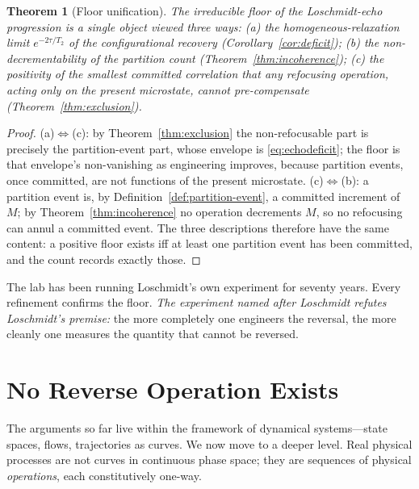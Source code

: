 \documentclass[11pt,a4paper]{article}
\theoremstyle{thmstyle}
\newtheorem{theorem}{Theorem}[section]
\theoremstyle{definition}
\theoremstyle{remark}
\newcommand{\Ttwo}{T_{2}}
\newcommand{\Count}{M}
\begin{document}
\begin{theorem}[Floor unification]
\label{thm:floor}
The irreducible floor of the Loschmidt-echo progression is a single
object viewed three ways: (a) the homogeneous-relaxation limit
$e^{-2\tau/\Ttwo}$ of the configurational recovery
(Corollary~\ref{cor:deficit}); (b) the non-decrementability of the
partition count (Theorem~\ref{thm:incoherence}); (c) the positivity of
the smallest committed correlation that any refocusing operation, acting
only on the present microstate, cannot pre-compensate
(Theorem~\ref{thm:exclusion}).
\end{theorem}

\begin{proof}
(a)$\Leftrightarrow$(c): by Theorem~\ref{thm:exclusion} the
non-refocusable part is precisely the partition-event part, whose
envelope is \eqref{eq:echodeficit}; the floor is that envelope's
non-vanishing as engineering improves, because partition events, once
committed, are not functions of the present microstate.
(c)$\Leftrightarrow$(b): a partition event is, by
Definition~\ref{def:partition-event}, a committed increment of $\Count$;
by Theorem~\ref{thm:incoherence} no operation decrements $\Count$, so no
refocusing can annul a committed event. The three descriptions therefore
have the same content: a positive floor exists iff at least one partition
event has been committed, and the count records exactly those.
\end{proof}

The lab has been running Loschmidt's own experiment for seventy years.
Every refinement confirms the floor. \emph{The experiment named after
Loschmidt refutes Loschmidt's premise:} the more completely one engineers
the reversal, the more cleanly one measures the quantity that cannot be
reversed.

\section{No Reverse Operation Exists}
\label{sec:operations}

The arguments so far live within the framework of dynamical
systems---state spaces, flows, trajectories as curves. We now move to a
deeper level. Real physical processes are not curves in continuous phase
space; they are sequences of physical \emph{operations}, each
constitutively one-way.
\end{document}
